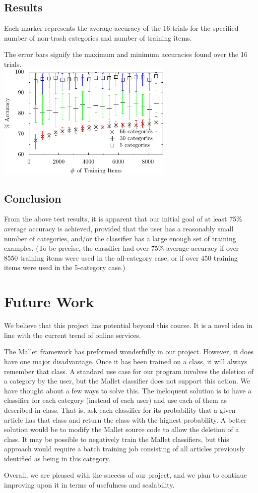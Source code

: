 \documentclass[letterpaper]{article}
\begin{document}
\subsection{Results}
Each marker represents the average accuracy of the 16 trials for the specified number of non-trash categories and number of training items.

The error bars signify the maximum and minimum accuracies found over the 16 trials.\\

\noindent\includegraphics[width=3.35in]{data.pdf}

\subsection{Conclusion}
From the above test results, it is apparent that our initial goal of at least 75\% average accuracy is achieved, provided that the user has a reasonably small number of categories, and/or the classifier has a large enough set of training examples. (To be precise, the classifier had over 75\% average accuracy if over 8550 training items were used in the all-category case, or if over 450 training items were used in the 5-category case.)

\section{Future Work}
We believe that this project has potential beyond this course. It is a novel idea in line with the current trend of online services.

The Mallet framework has preformed wonderfully in our project. However, it does have one major disadvantage. Once it has been trained on a class, it will always remember that class. A standard use case for our program involves the deletion of a category by the user, but the Mallet classifier does not support this action. We have thought about a few ways to solve this. The ineloquent solution is to have a classifier for each category (instead of each user) and use each of them as described in class. That is, ask each classifier for its probability that a given article has that class and return the class with the highest probability. A better solution would be to modify the Mallet source code to allow the deletion of a class. It may be possible to negatively train the Mallet classifiers, but this approach would require a batch training job consisting of all articles previously identified as being in this category.

Overall, we are pleased with the success of our project, and we plan to continue improving upon it in terms of usefulness and scalability.



\end{document}
